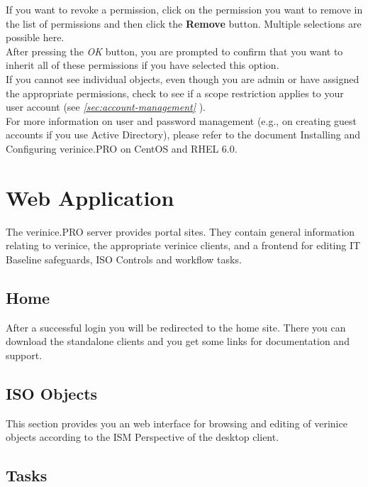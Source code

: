 \documentclass[a4paper,10pt]{book}
\begin{document}
If you want to revoke a permission, click on the permission you want to remove in the list of permissions and then click the
\textbf{Remove} button. Multiple selections are possible here.
\newline\\
After pressing the \textit{OK} button, you are prompted to confirm that you want to inherit all of these permissions if you have selected this option.
\newline\\
If you cannot see individual objects, even though you are admin or have assigned the appropriate permissions, check to see if a scope restriction applies
to your user account (see {\em \ref{sec:account-management} }).
\newline\\
For more information on user and password management (e.g., on creating guest accounts if you use Active Directory), please refer to the document Installing
and Configuring verinice.\textsc{PRO} on CentOS and RHEL 6.0.

\section{Web Application}
\label{sec:web-application}

The verinice.\textsc{PRO} server provides portal sites. They contain
general information relating to verinice, the appropriate verinice
clients, and a frontend for editing IT Baseline safeguards, ISO
Controls and workflow tasks.

\subsection{Home}
\label{sec:home}

After a successful login you will be redirected to the home
site. There you can download the standalone clients and you get some
links for documentation and support.

\subsection{ISO Objects}
\label{sec:iso-objects}

This section provides you an web interface for browsing and editing of
verinice objects according to the ISM Perspective of the desktop
client.


\subsection{Tasks}
\label{sec:tasks}
\end{document}
